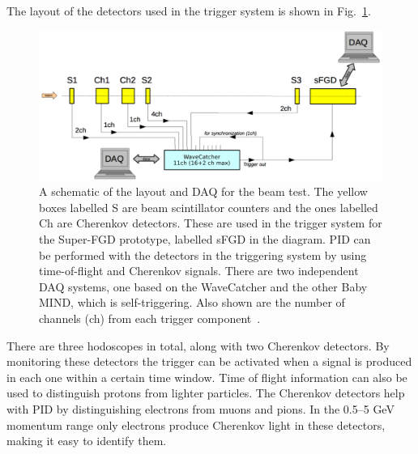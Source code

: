 \documentclass[aps,pra,12pt,notitlepage,tightenlines]{revtex4-1}
\begin{document}
The layout of the detectors used in the trigger system is shown in Fig.\ \ref{fig:daq}.
\begin{figure}
 \includegraphics[trim={1px 1px 1px 2px}, clip, scale=0.55]{daq2}
 \caption{A schematic of the layout and DAQ for the beam test. The yellow boxes labelled S are beam scintillator counters and the ones labelled Ch are Cherenkov detectors. These are used in the trigger system for the Super-FGD prototype, labelled sFGD in the diagram. PID can be performed with the detectors in the triggering system by using time-of-flight and Cherenkov signals. There are two independent DAQ systems, one based on the WaveCatcher and the other Baby MIND, which is self-triggering. Also shown are the number of channels (ch) from each trigger component~\cite{Korzenev2018}.}
 \label{fig:daq}
\end{figure}
There are three hodoscopes in total, along with two Cherenkov detectors. By monitoring these detectors the trigger can be activated when a signal is produced in each one within a certain time window. Time of flight information can also be used to distinguish protons from lighter particles. The Cherenkov detectors help with PID by distinguishing electrons from muons and pions. In the 0.5--5 GeV momentum range only electrons produce Cherenkov light in these detectors, making it easy to identify them.
\end{document}
